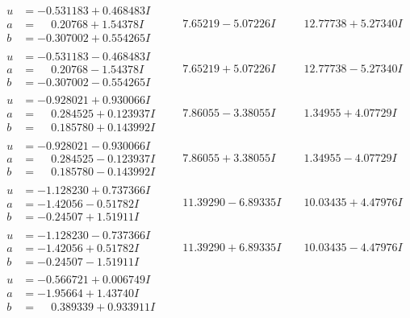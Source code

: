 \documentclass[1p]{elsarticle_modified}
\theoremstyle{definition}
\begin{document}
$$\begin{array}{c|c|c}
\begin{aligned}
u &= -0.531183 + 0.468483 I \\
a &= \phantom{-}0.20768 + 1.54378 I \\
b &= -0.307002 + 0.554265 I\end{aligned}
 & \phantom{-}7.65219 - 5.07226 I & \phantom{-}12.77738 + 5.27340 I \\ \hline\begin{aligned}
u &= -0.531183 - 0.468483 I \\
a &= \phantom{-}0.20768 - 1.54378 I \\
b &= -0.307002 - 0.554265 I\end{aligned}
 & \phantom{-}7.65219 + 5.07226 I & \phantom{-}12.77738 - 5.27340 I \\ \hline\begin{aligned}
u &= -0.928021 + 0.930066 I \\
a &= \phantom{-}0.284525 + 0.123937 I \\
b &= \phantom{-}0.185780 + 0.143992 I\end{aligned}
 & \phantom{-}7.86055 - 3.38055 I & \phantom{-}1.34955 + 4.07729 I \\ \hline\begin{aligned}
u &= -0.928021 - 0.930066 I \\
a &= \phantom{-}0.284525 - 0.123937 I \\
b &= \phantom{-}0.185780 - 0.143992 I\end{aligned}
 & \phantom{-}7.86055 + 3.38055 I & \phantom{-}1.34955 - 4.07729 I \\ \hline\begin{aligned}
u &= -1.128230 + 0.737366 I \\
a &= -1.42056 - 0.51782 I \\
b &= -0.24507 + 1.51911 I\end{aligned}
 & \phantom{-}11.39290 - 6.89335 I & \phantom{-}10.03435 + 4.47976 I \\ \hline\begin{aligned}
u &= -1.128230 - 0.737366 I \\
a &= -1.42056 + 0.51782 I \\
b &= -0.24507 - 1.51911 I\end{aligned}
 & \phantom{-}11.39290 + 6.89335 I & \phantom{-}10.03435 - 4.47976 I \\ \hline\begin{aligned}
u &= -0.566721 + 0.006749 I \\
a &= -1.95664 + 1.43740 I \\
b &= \phantom{-}0.389339 + 0.933911 I\end{aligned}

\end{array}$$
\end{document}
